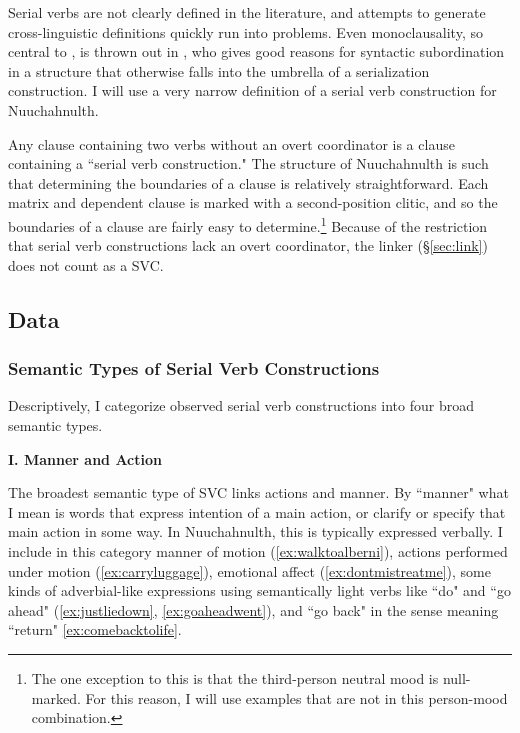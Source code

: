 Serial verbs are not clearly defined in the literature, and attempts to generate cross-linguistic definitions quickly run into problems. Even monoclausality, so central to \cite{aikhenvalddixon2006}, is thrown out in \cite{butt1995}, who gives good reasons for syntactic subordination in a structure that otherwise falls into the umbrella of a serialization construction. I will use a very narrow definition of a serial verb construction for Nuuchahnulth.

Any clause containing two verbs without an overt coordinator is a clause containing a ``serial verb construction." The structure of Nuuchahnulth is such that determining the boundaries of a clause is relatively straightforward. Each matrix and dependent clause is marked with a second-position clitic, and so the boundaries of a clause are fairly easy to determine.\footnote{The one exception to this is that the third-person neutral mood is null-marked. For this reason, I will use examples that are not in this person-mood combination.} Because of the restriction that serial verb constructions lack an overt coordinator, the linker (\S\ref{sec:link}) does not count as a SVC.


\subsection{Data}

\subsubsection{Semantic Types of Serial Verb Constructions}

Descriptively, I categorize observed serial verb constructions into four broad semantic types.

\vspace{10pt}

\noindent \textbf{I. Manner and Action}

\vspace{10pt}

The broadest semantic type of SVC links actions and manner. By ``manner" what I mean is words that express intention of a main action, or clarify or specify that main action in some way. In Nuuchahnulth, this is typically expressed verbally. I include in this category manner of motion (\ref{ex:walktoalberni}), actions performed under motion (\ref{ex:carryluggage}), emotional affect (\ref{ex:dontmistreatme}), some kinds of adverbial-like expressions using semantically light verbs like ``do" and ``go ahead" (\ref{ex:justliedown}, \ref{ex:goaheadwent}), and ``go back" in the sense meaning ``return" \ref{ex:comebacktolife}.


